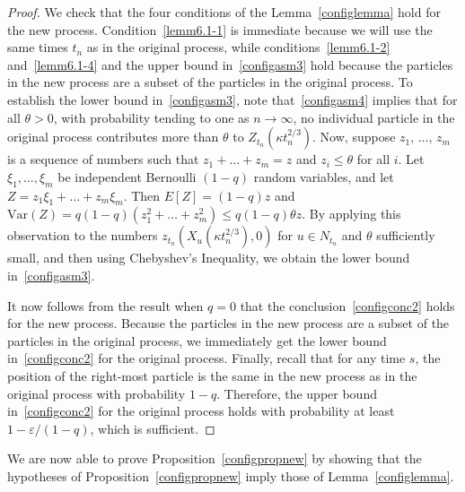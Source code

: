 \documentclass[AHL,Unicode,longabstracts,published]{cedram}
\newcommand*\eps{\varepsilon}
\newcommand{\1} {\mathds{1}}
\begin{document}
\begin{proof}
We check that the four conditions of the Lemma~\ref{configlemma} hold for the new process. Condition~\eqref{lemm6.1-1} is immediate because we will use the same times $t_n$ as in the original process, while conditions~\eqref{lemm6.1-2} and~\eqref{lemm6.1-4} and the upper bound in~\eqref{configasm3} hold because the particles in the new process are a subset of the particles in the original process. To establish the lower bound in~\eqref{configasm3}, note that~\eqref{configasm4} implies that for all $\theta > 0$, with probability tending to one as $n \rightarrow \infty$, no individual particle in the original process contributes more than $\theta$ to $Z_{t_n}(\kappa t_n^{2/3})$. Now, suppose $z_1,\,\dots,\,z_m$ is a sequence of numbers such that $z_1 + \dots + z_m = z$ and $z_i \leq \theta$ for all $i$. Let $\xi_1, \dots, \xi_m$ be independent Bernoulli $(1-q)$ random variables, and let $Z = z_1 \xi_1 + \dots + z_m \xi_m$. Then $E[Z] = (1 - q) z$ and $\text{Var}(Z) = q(1-q)(z_1^2 + \dots + z_m^2) \leq q(1 - q) \theta z$. By applying this observation to the numbers $z_{t_n}(X_u(\kappa t_n^{2/3}), 0)$ for $u \in N_{t_n}$ and $\theta$ sufficiently small, and then using Chebyshev's Inequality, we obtain the lower bound in~\eqref{configasm3}.

It now follows from the result when $q = 0$ that the conclusion~\eqref{configconc2} holds for the new process. Because the particles in the new process are a subset of the particles in the original process, we immediately get the lower bound in~\eqref{configconc2} for the original process. Finally, recall that for any time $s$, the position of the right-most particle is the same in the new process as in the original process with probability $1 - q$. Therefore, the upper bound in~\eqref{configconc2} for the original process holds with probability at least $1 - \eps/(1 - q)$, which is sufficient.
\end{proof}

We are now able to prove Proposition~\ref{configpropnew} by showing that the hypotheses of Proposition~\ref{configpropnew} imply those of Lemma~\ref{configlemma}.
\end{document}
